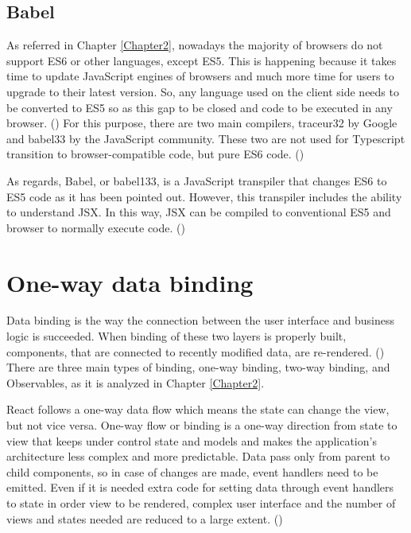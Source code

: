 \subsection{Babel}

As referred in Chapter \ref{Chapter2}, nowadays the majority of browsers do not support ES6 or other languages, except ES5. This is happening because it takes time to update JavaScript engines of browsers and much more time for users to upgrade to their latest version. So, any language used on the client side needs to be converted to ES5 so as this gap to be closed and code to be executed in any browser. (\cite{Reference10}) For this purpose, there are two main compilers, traceur32 by Google and babel33 by the JavaScript community. These two are not used for Typescript transition to browser-compatible code, but pure ES6 code. (\cite{murray2018ng})

As regards, Babel, or babel133, is a JavaScript transpiler that changes ES6 to ES5 code as it has been pointed out. However, this transpiler includes the ability to understand JSX. In this way, JSX can be compiled to conventional ES5 and browser to normally execute code.  (\cite{Reference10})

\section{One-way data binding}

Data binding is the way the connection between the user interface and business logic is succeeded. When binding of these two layers is properly built, components, that are connected to recently modified data, are re-rendered. (\cite{Reference21}) There are three main types of binding, one-way binding, two-way binding, and Observables, as it is analyzed in Chapter \ref{Chapter2}. \par

React follows a one-way data flow which means the state can change the view, but not vice versa. One-way flow or binding is a one-way direction from state to view that keeps under control state and models and makes the application's architecture less complex and more predictable. Data pass only from parent to child components, so in case of changes are made, event handlers need to be emitted. Even if it is needed extra code for setting data through event handlers to state in order view to be rendered, complex user interface and the number of views and states needed are reduced to a large extent. (\cite{reactQuickly}) \par

